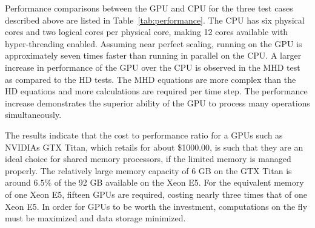Performance comparisons between the GPU and CPU for the three test cases described above are listed in Table~\ref{tab:performance}.  The CPU has six physical cores and two logical cores per physical core, making 12 cores available with hyper-threading enabled.  Assuming near perfect scaling, running on the GPU is approximately seven times faster than running in parallel on the CPU.  A larger increase in performance of the GPU over the CPU is observed in the MHD test as compared to the HD tests.  The MHD equations are more complex than the HD equations and more calculations are required per time step.  The performance increase demonstrates the superior ability of the GPU to process many operations simultaneously.  

 The results indicate that the cost to performance ratio for a  GPUs such as NVIDIAs GTX Titan, which retails for about \$1000.00, is such that they are an ideal choice for shared memory processors, if the limited memory is managed properly.  The relatively large memory capacity of 6 GB on the GTX Titan is around $6.5\%$ of the 92 GB available on the Xeon E5.  For the equivalent memory of one Xeon E5, fifteen GPUs are required, costing nearly three times that of one Xeon E5.  In order for GPUs to be worth the investment, computations on the fly must be maximized and data storage minimized.  




